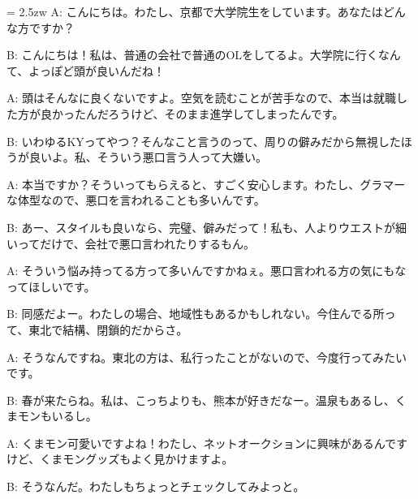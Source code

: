 \documentclass[11pt]{amsart}
\title{}
\author{}
\newenvironment{hangall}[1]{\hangindent = 2.5zw\everypar{\hangindent = 2.5zw}}{}
\begin{document}
\maketitle
\begin{hangall}{}%
A: こんにちは。わたし、京都で大学院生をしています。あなたはどんな方ですか？

B: こんにちは！私は、普通の会社で普通のOLをしてるよ。大学院に行くなんて、よっぽど頭が良いんだね！

A: 頭はそんなに良くないですよ。空気を読むことが苦手なので、本当は就職した方が良かったんだろうけど、そのまま進学してしまったんです。

B: いわゆるKYってやつ？そんなこと言うのって、周りの僻みだから無視したほうが良いよ。私、そういう悪口言う人って大嫌い。

A: 本当ですか？そういってもらえると、すごく安心します。わたし、グラマーな体型なので、悪口を言われることも多いんです。

B: あー、スタイルも良いなら、完璧、僻みだって！私も、人よりウエストが細いってだけで、会社で悪口言われたりするもん。

A: そういう悩み持ってる方って多いんですかねぇ。悪口言われる方の気にもなってほしいです。

B: 同感だよー。わたしの場合、地域性もあるかもしれない。今住んでる所って、東北で結構、閉鎖的だからさ。

A: そうなんですね。東北の方は、私行ったことがないので、今度行ってみたいです。

B: 春が来たらね。私は、こっちよりも、熊本が好きだなー。温泉もあるし、くまモンもいるし。

A: くまモン可愛いですよね！わたし、ネットオークションに興味があるんですけど、くまモングッズもよく見かけますよ。

B: そうなんだ。わたしもちょっとチェックしてみよっと。
\end{hangall}
\end{document}

